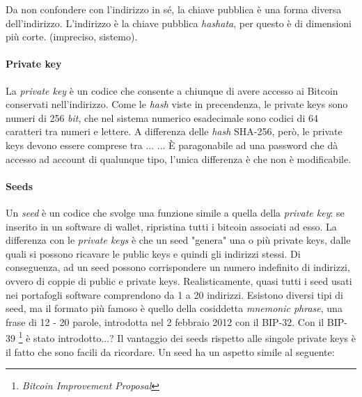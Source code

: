 \documentclass {article}
\begin{document}
Da non confondere con l'indirizzo in sé, la chiave pubblica è una forma diversa dell'indirizzo.
L'indirizzo è la chiave pubblica \textit{hashata}, per questo è di dimensioni più corte. (impreciso, sistemo).

\paragraph {Private key}

La \textit{private key} è un codice che consente a chiunque di avere accesso ai Bitcoin conservati nell'indirizzo.
Come le \textit{hash} viste in precendenza, le private keys sono numeri di 256 \textit{bit}, che nel sistema numerico esadecimale sono codici di 64 caratteri tra numeri e lettere.
A differenza delle \textit{hash} SHA-256, però, le private keys devono essere comprese tra ... ... 
È paragonabile ad una password che dà accesso ad account di qualunque tipo, l'unica differenza è che non è modificabile.

\paragraph {Seeds}

Un \textit{seed} è un codice che svolge una funzione simile a quella della \textit{private key}: se inserito in un software di wallet, ripristina tutti i bitcoin associati ad esso.
La differenza con le \textit{private keys} è che un seed "genera" una o più private keys, dalle quali si possono ricavare le public keys e quindi gli indirizzi stessi.
Di conseguenza, ad un seed possono corrispondere un numero indefinito di indirizzi, ovvero di coppie di public e private keys.
Realisticamente, quasi tutti i seed usati nei portafogli software comprendono da 1 a 20 indirizzi.
Esistono diversi tipi di seed, ma il formato più famoso è quello della cosiddetta \textit{mnemonic phrase}, una frase di 12 - 20 parole, introdotta nel 2 febbraio 2012 con il BIP-32.
Con il BIP-39 \footnote{\textit{Bitcoin Improvement Proposal}} è stato introdotto...?
Il vantaggio dei seeds rispetto alle singole private keys è il fatto che sono facili da ricordare. Un seed ha un aspetto simile al seguente:
\end{document}
